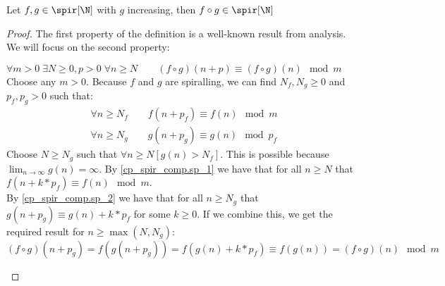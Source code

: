 \begin{theorem}\label{cp_spir_comp}
Let $f,g\in\spir[\N]$ with $g$ increasing, then $f\circ g\in\spir[\N]$
\begin{proof}
	The first property of the definition is a well-known result from analysis. We will focus on the second property:\\
	\begin{stp}{$\forall m>0\;\exists N\geq0,p>0\;\forall n\geq N\qquad(f\circ g)(n+p) \equiv (f\circ g)(n)\mod m$}
		Choose any $m>0$.
		Because $f$ and $g$ are spiralling, we can find $N_f,N_g\geq0$ and $p_f,p_g>0$ such that:
		\begin{align}
			\forall n\geq N_f\qquad f(n+p_f) \equiv f(n) \mod m \label{cp_spir_comp.sp_1} \\
			\forall n\geq N_g\qquad g(n+p_g) \equiv g(n) \mod p_f \label{cp_spir_comp.sp_2}
		\end{align}
		Choose $N\geq N_g$ such that $\forall n\geq N [g(n) > N_f]$. 
		This is possible because $\lim_{n\to\infty}g(n)=\infty$.
		By \cref{cp_spir_comp.sp_1} we have that for all $n \geq N$ that $f(n+k*p_f) \equiv f(n) \mod m$. \\
		By \cref{cp_spir_comp.sp_2} we have that for all $n\geq N_g$ that $g(n+p_g) \equiv g(n) + k*p_f$ for some $k\geq 0$.
		If we combine this, we get the required result for $n\geq \max(N,N_g)$:
		$$(f\circ g)(n + p_g) = f(g(n+p_g)) = f(g(n)+k*p_f) \equiv f(g(n)) = (f\circ g)(n) \mod m$$
	\end{stp}
\end{proof}
\end{theorem}

